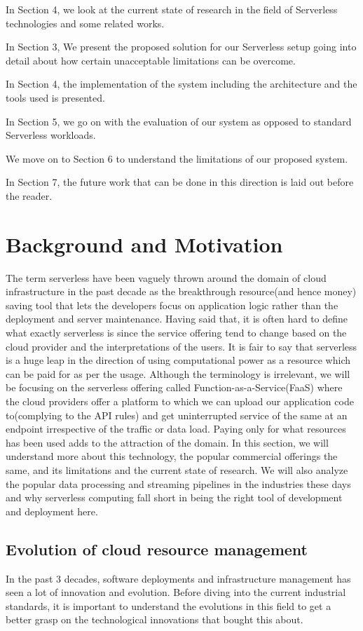 \documentclass[12pt,titlepage]{article}
\begin{document}
In Section 4, we look at the current state of research in the field of
Serverless technologies and some related works.

In Section 3, We present the proposed solution for our Serverless setup going
into detail about how certain unacceptable limitations can be overcome.

In Section 4, the implementation of the system including the architecture and
the tools used is presented.

In Section 5, we go on with the evaluation of our system as opposed to standard
Serverless workloads.

We move on to Section 6 to understand the limitations of our proposed system.

In Section 7, the future work that can be done in this direction is laid out
before the reader.

\section{Background and Motivation}
\label{sec:orgd115424}
The term serverless have been vaguely thrown around the domain of cloud
infrastructure in the past decade as the breakthrough resource(and hence money)
saving tool that lets the developers focus on application logic rather than the
deployment and server maintenance. Having said that, it is often hard to define
what exactly serverless is since the service offering tend to change based on
the cloud provider and the interpretations of the users. It is fair to say that
serverless is a huge leap in the direction of using computational power as a
resource which can be paid for as per the usage.
Although the terminology is irrelevant, we will be focusing on the serverless
offering called Function-as-a-Service(FaaS) where the cloud providers offer a
platform to which we can upload our application code to(complying to the API
rules) and get uninterrupted service of the same at an endpoint irrespective of
the traffic or data load. Paying only for what resources has been used adds to
the attraction of the domain.
In this section, we will understand more about this technology, the
popular commercial offerings the same, and its limitations and the current state
of research. 
We will also analyze the popular data processing and streaming pipelines in the
industries these days and why serverless computing fall short in being the right
tool of development and deployment here.
\subsection{Evolution of cloud resource management}
\label{sec:orgbbeba07}
In the past 3 decades, software deployments and infrastructure management has
seen a lot of innovation and evolution. Before diving into the current
industrial standards, it is important to understand the evolutions in this field
to get a better grasp on the technological innovations that bought this about.
\end{document}
